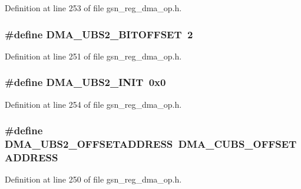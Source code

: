 Definition at line 253 of file gsn\_\-reg\_\-dma\_\-op.h.

\hypertarget{a00547_a39c705909c5c5b581e63d83bb178d940}{
\subsubsection[{DMA\_\-UBS2\_\-BITOFFSET}]{\setlength{\rightskip}{0pt plus 5cm}\#define DMA\_\-UBS2\_\-BITOFFSET~2}}
\label{a00547_a39c705909c5c5b581e63d83bb178d940}


Definition at line 251 of file gsn\_\-reg\_\-dma\_\-op.h.

\hypertarget{a00547_ab54c7aead38fa343411178576e1e82dc}{
\subsubsection[{DMA\_\-UBS2\_\-INIT}]{\setlength{\rightskip}{0pt plus 5cm}\#define DMA\_\-UBS2\_\-INIT~0x0}}
\label{a00547_ab54c7aead38fa343411178576e1e82dc}


Definition at line 254 of file gsn\_\-reg\_\-dma\_\-op.h.

\hypertarget{a00547_a58a43cfc475c82cce863a3d389ec247b}{
\subsubsection[{DMA\_\-UBS2\_\-OFFSETADDRESS}]{\setlength{\rightskip}{0pt plus 5cm}\#define DMA\_\-UBS2\_\-OFFSETADDRESS~DMA\_\-CUBS\_\-OFFSETADDRESS}}
\label{a00547_a58a43cfc475c82cce863a3d389ec247b}


Definition at line 250 of file gsn\_\-reg\_\-dma\_\-op.h.


